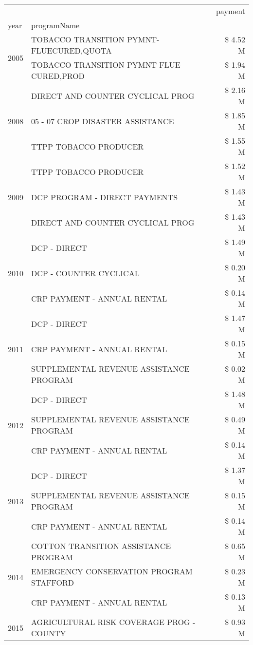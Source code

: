 \begin{tabular}{llr}
\toprule
 &  & payment \\
year & programName &  \\
\midrule
\multirow[t]{2}{*}{2005} & TOBACCO TRANSITION PYMNT-FLUECURED,QUOTA & \$ 4.52 M \\
 & TOBACCO TRANSITION PYMNT-FLUE CURED,PROD & \$ 1.94 M \\
\cline{1-3}
\multirow[t]{3}{*}{2008} & DIRECT AND COUNTER CYCLICAL PROG & \$ 2.16 M \\
 & 05 - 07 CROP DISASTER ASSISTANCE & \$ 1.85 M \\
 & TTPP TOBACCO PRODUCER & \$ 1.55 M \\
\cline{1-3}
\multirow[t]{3}{*}{2009} & TTPP TOBACCO PRODUCER & \$ 1.52 M \\
 & DCP PROGRAM - DIRECT PAYMENTS & \$ 1.43 M \\
 & DIRECT AND COUNTER CYCLICAL PROG & \$ 1.43 M \\
\cline{1-3}
\multirow[t]{3}{*}{2010} & DCP - DIRECT & \$ 1.49 M \\
 & DCP - COUNTER CYCLICAL & \$ 0.20 M \\
 & CRP PAYMENT - ANNUAL RENTAL & \$ 0.14 M \\
\cline{1-3}
\multirow[t]{3}{*}{2011} & DCP - DIRECT & \$ 1.47 M \\
 & CRP PAYMENT - ANNUAL RENTAL & \$ 0.15 M \\
 & SUPPLEMENTAL REVENUE ASSISTANCE PROGRAM & \$ 0.02 M \\
\cline{1-3}
\multirow[t]{3}{*}{2012} & DCP - DIRECT & \$ 1.48 M \\
 & SUPPLEMENTAL REVENUE ASSISTANCE PROGRAM & \$ 0.49 M \\
 & CRP PAYMENT - ANNUAL RENTAL & \$ 0.14 M \\
\cline{1-3}
\multirow[t]{3}{*}{2013} & DCP - DIRECT & \$ 1.37 M \\
 & SUPPLEMENTAL REVENUE ASSISTANCE PROGRAM & \$ 0.15 M \\
 & CRP PAYMENT - ANNUAL RENTAL & \$ 0.14 M \\
\cline{1-3}
\multirow[t]{3}{*}{2014} & COTTON TRANSITION ASSISTANCE PROGRAM & \$ 0.65 M \\
 & EMERGENCY CONSERVATION PROGRAM STAFFORD & \$ 0.23 M \\
 & CRP PAYMENT - ANNUAL RENTAL & \$ 0.13 M \\
\cline{1-3}
\multirow[t]{3}{*}{2015} & AGRICULTURAL RISK COVERAGE PROG - COUNTY & \$ 0.93 M \\

\end{tabular}
